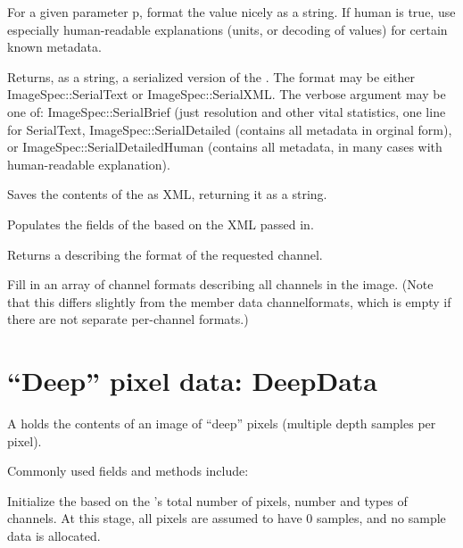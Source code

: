 For a given parameter {\cf p}, format the value nicely as a string.
If {\cf human} is true, use
especially human-readable explanations (units, or decoding of
values) for certain known metadata.
\apiend


\NEW %
Returns, as a string, a serialized version of the \ImageSpec.
The {\cf format} may be either {\cf ImageSpec::SerialText} or
{\cf ImageSpec::SerialXML}.
The {\cf verbose} argument may be one of: {\cf ImageSpec::SerialBrief} (just
resolution and other vital statistics, one line for {\cf SerialText},
{\cf ImageSpec::SerialDetailed} (contains all metadata in orginal form), or
{\cf ImageSpec::SerialDetailedHuman} (contains all metadata, in many cases
with human-readable explanation).

\apiend

Saves the contents of the \ImageSpec as XML, returning it as a string.
\apiend

Populates the fields of the \ImageSpec based on the XML passed in.
\apiend

Returns a \TypeDesc describing the format of the requested channel.
\apiend

Fill in an array of channel formats describing all channels in the
image.  (Note that this differs slightly from the member data 
{\cf channelformats}, which is empty if there are not separate per-channel
formats.)
\apiend



\section{``Deep'' pixel data: {\cf DeepData}}
\label{sec:deepdata}

A \DeepData holds the contents of an image of ``deep'' pixels (multiple
depth samples per pixel).

\noindent Commonly used \DeepData fields and methods include:

Initialize the \DeepData based on the \ImageSpec's total number of pixels,
number and types of channels. At this stage, all pixels are assumed to
have 0 samples, and no sample data is allocated.
\apiend

